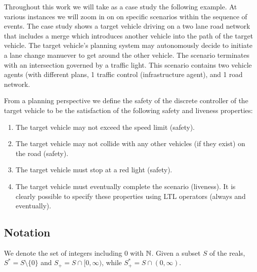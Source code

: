 \begin{exmp}
	
	Throughout this work we will take as a case study the following example. At various instances we will zoom in on on specific scenarios within the sequence of events. The case study shows a target vehicle driving on a two lane road network that includes a merge which introduces another vehicle into the path of the target vehicle. The target vehicle's planning system may autonomously decide to initiate a lane change manuever to get around the other vehicle. The scenario terminates with an intersection governed by a traffic light. This scenario contains two vehicle agents (with different plans, 1 traffic control (infrastructure agent), and 1 road network. 
	
\end{exmp}

From a planning perspective we define the safety of the discrete controller of the target vehicle to be the satisfaction of the following safety and liveness properties:
\begin{enumerate}
	\item The target vehicle may not exceed the speed limit (safety).
	\item The target vehicle may not collide with any other vehicles (if they exist) on the road (safety).
	\item The target vehicle must stop at a red light (safety).
	\item The target vehicle must eventually complete the scenario (liveness).
It is clearly possible to specify these properties using LTL operators (always and eventually).
\end{enumerate}

%
%
%
%

\subsection{Notation}
We denote the set of integers including 0 with $\mathbb{N}$. 
Given a subset $S$ of the reals, $S^* = S \setminus \{0\}$ and $S_+ = S \cap [0,\infty)$,
while $S_+^* = S \cap (0,\infty)$.